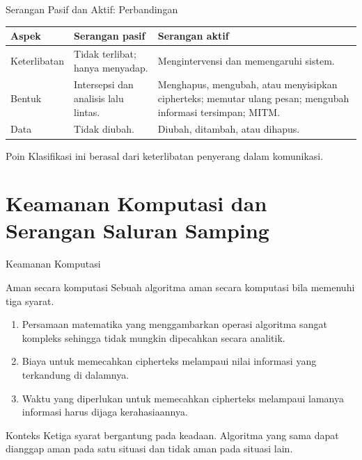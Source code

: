\documentclass[aspectratio=169,11pt]{beamer}
\begin{document}
\begin{frame}{Serangan Pasif dan Aktif: Perbandingan}
    \footnotesize
    \begin{tabularx}{\linewidth}{@{}>{\raggedright\arraybackslash}p{2.4cm}
        >{\raggedright\arraybackslash}X
        >{\raggedright\arraybackslash}X@{}}
        \toprule
        \textbf{Aspek} & \textbf{Serangan pasif} & \textbf{Serangan aktif} \\
        \midrule
        Keterlibatan & Tidak terlibat; hanya menyadap. & Mengintervensi dan
        memengaruhi sistem. \\
        \addlinespace
        Bentuk & Intersepsi dan analisis lalu lintas. & Menghapus, mengubah,
        atau menyisipkan cipherteks; memutar ulang pesan; mengubah informasi
        tersimpan; MITM. \\
        \addlinespace
        Data & Tidak diubah. & Diubah, ditambah, atau dihapus. \\
        \bottomrule
    \end{tabularx}
    \vspace{0.2cm}
    \begin{alertblock}{Poin}
        Klasifikasi ini berasal dari keterlibatan penyerang dalam komunikasi.
    \end{alertblock}
\end{frame}

\section{Keamanan Komputasi dan Serangan Saluran Samping}

\begin{frame}{Keamanan Komputasi}
    \begin{block}{Aman secara komputasi}
        Sebuah algoritma aman secara komputasi bila memenuhi tiga syarat.
    \end{block}
    \vspace{0.15cm}
    \begin{enumerate}
        \item Persamaan matematika yang menggambarkan operasi algoritma sangat
              kompleks sehingga tidak mungkin dipecahkan secara analitik.
        \item Biaya untuk memecahkan cipherteks melampaui nilai informasi
              yang terkandung di dalamnya.
        \item Waktu yang diperlukan untuk memecahkan cipherteks melampaui
              lamanya informasi harus dijaga kerahasiaannya.
    \end{enumerate}
    \vspace{0.1cm}
    \begin{alertblock}{Konteks}
        Ketiga syarat bergantung pada keadaan. Algoritma yang sama dapat
        dianggap aman pada satu situasi dan tidak aman pada situasi lain.
    \end{alertblock}
\end{frame}
\end{document}
